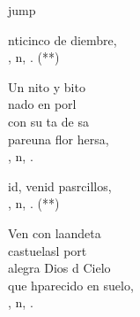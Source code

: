 \begin{cancion}jump\\
	\begin{chorus}%
		nticinco de diembre,\\
		, n, . (**)\jump\\
	\end{chorus}%
	Un nito y bito\\
	 nado en  porl\\
	con su ta de sa\\
	pareuna flor hersa,\\
	, n, .\jump\\
	\begin{chorus}%
		id, venid pasrcillos,\\
		, n, . (**)\jump\\
	\end{chorus}%
	Ven con laandeta\\
	castuelasl port\\
	alegra Dios d Cielo\\
	que hparecido en  suelo,\\
	, n, .\\
\end{cancion}%
